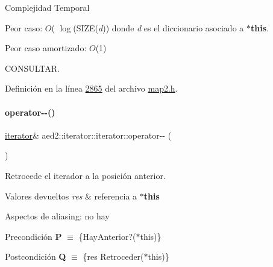 \begin{DoxyDescription}
\item[Complejidad Temporal]
\begin{DoxyItemize}
\item Peor caso\+: $O$( $\log$(S\+I\+ZE({\itshape d})) donde {\itshape d} es el diccionario asociado a {\bfseries $\ast$this}.
\item Peor caso amortizado\+: $O$(1) 
\end{DoxyItemize}
\end{DoxyDescription}

C\+O\+N\+S\+U\+L\+T\+AR. 

Definición en la línea \hyperlink{map2_8h_source_l02865}{2865} del archivo \hyperlink{map2_8h_source}{map2.\+h}.

\mbox{\label{classaed2_1_1iterator_1_1iterator_a260692ee1d51f87ef547b4a798fc2de5_a260692ee1d51f87ef547b4a798fc2de5}} 
\paragraph{\texorpdfstring{operator-\/-\/()}{operator--()}\hspace{0.1cm}{\footnotesize\ttfamily [1/2]}}
{\footnotesize\ttfamily \hyperlink{classaed2_1_1iterator_1_1iterator}{iterator}\& aed2\+::iterator\+::iterator\+::operator-\/-\/ (\begin{DoxyParamCaption}{ }\end{DoxyParamCaption})\hspace{0.3cm}{\ttfamily [inline]}}



Retrocede el iterador a la posición anterior. 


\begin{DoxyRetVals}{Valores devueltos}
{\em res} & referencia a {\bfseries $\ast$this}\\
\hline
\end{DoxyRetVals}
\begin{DoxyParagraph}{Aspectos de aliasing\+:}
no hay
\end{DoxyParagraph}
\begin{DoxyPrecond}{Precondición}
{\bfseries P} $\equiv$ \{Hay\+Anterior?($\ast$this)\} 
\end{DoxyPrecond}
\begin{DoxyPostcond}{Postcondición}
{\bfseries Q} $\equiv$ \{res  Retroceder($\ast$this)\}
\end{DoxyPostcond}

